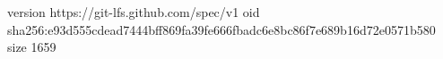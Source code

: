 version https://git-lfs.github.com/spec/v1
oid sha256:e93d555cdead7444bff869fa39fe666fbadc6e8bc86f7e689b16d72e0571b580
size 1659
